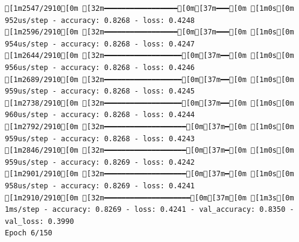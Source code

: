 \documentclass[
  letterpaper,
  DIV=11,
  numbers=noendperiod]{scrartcl}
\begin{document}
\begin{verbatim}
[1m2547/2910[0m [32m━━━━━━━━━━━━━━━━━[0m[37m━━━[0m [1m0s[0m 952us/step - accuracy: 0.8268 - loss: 0.4248
[1m2596/2910[0m [32m━━━━━━━━━━━━━━━━━[0m[37m━━━[0m [1m0s[0m 954us/step - accuracy: 0.8268 - loss: 0.4247
[1m2644/2910[0m [32m━━━━━━━━━━━━━━━━━━[0m[37m━━[0m [1m0s[0m 956us/step - accuracy: 0.8268 - loss: 0.4246
[1m2689/2910[0m [32m━━━━━━━━━━━━━━━━━━[0m[37m━━[0m [1m0s[0m 959us/step - accuracy: 0.8268 - loss: 0.4245
[1m2738/2910[0m [32m━━━━━━━━━━━━━━━━━━[0m[37m━━[0m [1m0s[0m 960us/step - accuracy: 0.8268 - loss: 0.4244
[1m2792/2910[0m [32m━━━━━━━━━━━━━━━━━━━[0m[37m━[0m [1m0s[0m 959us/step - accuracy: 0.8268 - loss: 0.4243
[1m2846/2910[0m [32m━━━━━━━━━━━━━━━━━━━[0m[37m━[0m [1m0s[0m 959us/step - accuracy: 0.8269 - loss: 0.4242
[1m2901/2910[0m [32m━━━━━━━━━━━━━━━━━━━[0m[37m━[0m [1m0s[0m 958us/step - accuracy: 0.8269 - loss: 0.4241
[1m2910/2910[0m [32m━━━━━━━━━━━━━━━━━━━━[0m[37m[0m [1m3s[0m 1ms/step - accuracy: 0.8269 - loss: 0.4241 - val_accuracy: 0.8350 - val_loss: 0.3990
Epoch 6/150


\end{verbatim}
\end{document}

